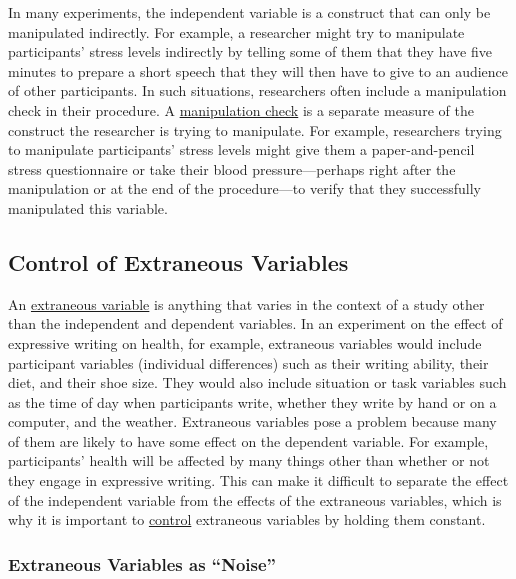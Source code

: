 \documentclass[
]{krantz}
\begin{document}
In many experiments, the independent variable is a construct that can only be manipulated indirectly. For example, a researcher might try to manipulate participants' stress levels indirectly by telling some of them that they have five minutes to prepare a short speech that they will then have to give to an audience of other participants. In such situations, researchers often include a manipulation check in their procedure. A \protect\hyperlink{manipulation-check-1}{manipulation check} is a separate measure of the construct the researcher is trying to manipulate. For example, researchers trying to manipulate participants' stress levels might give them a paper-and-pencil stress questionnaire or take their blood pressure---perhaps right after the manipulation or at the end of the procedure---to verify that they successfully manipulated this variable.

\hypertarget{control-of-extraneous-variables}{%
\subsection*{Control of Extraneous Variables}\label{control-of-extraneous-variables}}


An \protect\hyperlink{extraneous-variable}{extraneous variable} is anything that varies in the context of a study other than the independent and dependent variables. In an experiment on the effect of expressive writing on health, for example, extraneous variables would include participant variables (individual differences) such as their writing ability, their diet, and their shoe size. They would also include situation or task variables such as the time of day when participants write, whether they write by hand or on a computer, and the weather. Extraneous variables pose a problem because many of them are likely to have some effect on the dependent variable. For example, participants' health will be affected by many things other than whether or not they engage in expressive writing. This can make it difficult to separate the effect of the independent variable from the effects of the extraneous variables, which is why it is important to \protect\hyperlink{control}{control} extraneous variables by holding them constant.

\hypertarget{extraneous-variables-as-noise}{%
\subsubsection*{Extraneous Variables as ``Noise''}\label{extraneous-variables-as-noise}}
\end{document}
